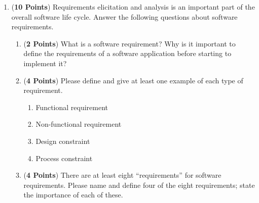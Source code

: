 \documentclass[12pt,epsf,psfig,graphicx]{article}
\begin{document}
% 
\begin{enumerate}

\item ({\bf 10 Points}) Requirements elicitation and analysis is an important part of the overall software life cycle.
	Answer the following questions about software requirements.

\begin{enumerate}

	\item ({\bf 2 Points}) What is a software requirement? Why is it important to define the requirements of a software
		application before starting to implement it?

	\item ({\bf 4 Points}) Please define and give at least one example of each type of requirement.

		\begin{enumerate}
			\item Functional requirement
			\item Non-functional requirement
			\item Design constraint
			\item Process constraint
		\end{enumerate}

	\item ({\bf 4 Points}) There are at least eight ``requirements'' for software requirements.  Please name and define
		four of the eight requirements; state the importance of each of these.



% 

% 
\end{enumerate}


\end{enumerate}
\end{document}
